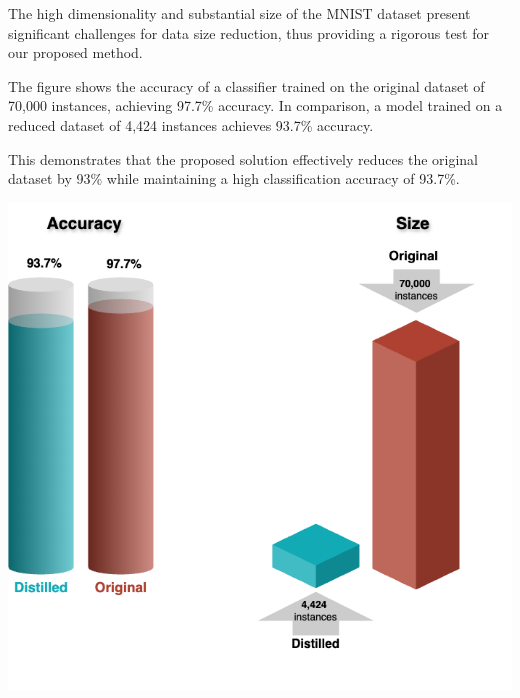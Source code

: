 The high dimensionality and substantial size of the MNIST dataset present significant challenges for data size reduction, thus providing a rigorous test for our proposed method.

\begin{minipage}{0.35\textwidth}
The figure shows the accuracy of a classifier trained on the original dataset of 70,000 instances, achieving 97.7\% accuracy. In comparison, a model trained on a reduced dataset of 4,424 instances achieves 93.7\% accuracy. 

This demonstrates that the proposed solution effectively reduces the original dataset by 93\% while maintaining a high classification accuracy of 93.7\%.
\end{minipage}
\hspace{0.02\textwidth} %
\begin{minipage}{0.6\textwidth}
    \centering
    \includegraphics[width=\textwidth]{images/mnist.png}
\end{minipage}